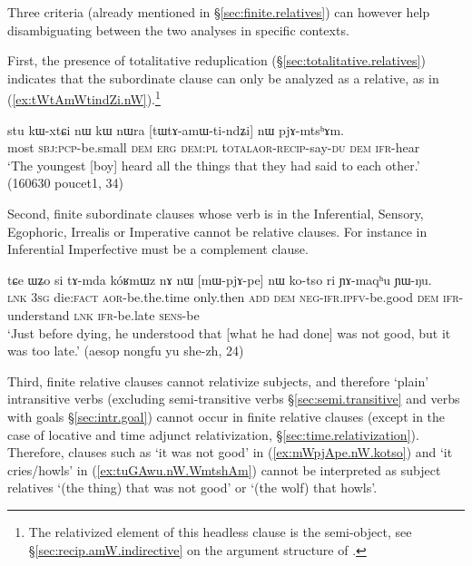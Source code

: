 Three criteria (already mentioned in §\ref{sec:finite.relatives}) can however help disambiguating between the two analyses in specific contexts. 

First, the presence of totalitative reduplication (§\ref{sec:totalitative.relatives}) indicates that the subordinate clause can only be analyzed as a relative, as in (\ref{ex:tWtAmWtindZi.nW}).\footnote{The relativized element of this headless clause is the semi-object, see §\ref{sec:recip.amW.indirective} on the argument structure of . }
 
\begin{exe}
\ex \label{ex:tWtAmWtindZi.nW}
\gll  stu kɯ-xtɕi nɯ kɯ nɯra [tɯ\redp{}tɤ-amɯ-ti-ndʑi] nɯ pjɤ-mtsʰɤm. \\
most \textsc{sbj}:\textsc{pcp}-be.small \textsc{dem} \textsc{erg} \textsc{dem}:\textsc{pl} t\textsc{otal}\redp{}\textsc{aor}-\textsc{recip}-say-\textsc{du} \textsc{dem} \textsc{ifr}-hear \\
\glt `The youngest [boy] heard all the things that they had said to each other.' (160630 poucet1, 34)
\end{exe}

Second, finite subordinate clauses whose verb is in the Inferential, Sensory, Egophoric, Irrealis or Imperative cannot be relative clauses. For instance  in Inferential Imperfective must be a complement clause.

\begin{exe}
\ex \label{ex:mWpjApe.nW.kotso}
\gll tɕe ɯʑo si tɤ-mda kóʁmɯz nɤ nɯ [mɯ-pjɤ-pe] nɯ ko-tso ri ɲɤ-maqʰu ɲɯ-ŋu. \\
\textsc{lnk} \textsc{3sg} die:\textsc{fact} \textsc{aor}-be.the.time only.then \textsc{add} \textsc{dem} \textsc{neg}-\textsc{ifr}.\textsc{ipfv}-be.good \textsc{dem} \textsc{ifr}-understand \textsc{lnk} \textsc{ifr}-be.late \textsc{sens}-be \\
\glt  `Just before dying, he understood that [what he had done] was not good, but it was too late.' (aesop nongfu yu she-zh, 24)
\end{exe}

Third, finite relative clauses cannot relativize subjects, and therefore `plain' intransitive verbs (excluding semi-transitive verbs §\ref{sec:semi.transitive} and verbs with goals §\ref{sec:intr.goal}) cannot occur in finite relative clauses (except in the case of locative and time adjunct relativization, §\ref{sec:time.relativization}). Therefore, clauses such as  `it was not good' in (\ref{ex:mWpjApe.nW.kotso}) and  `it cries/howls' in (\ref{ex:tuGAwu.nW.WmtshAm}) cannot be interpreted as subject relatives `(the thing) that was not good' or `(the wolf) that howls'.


